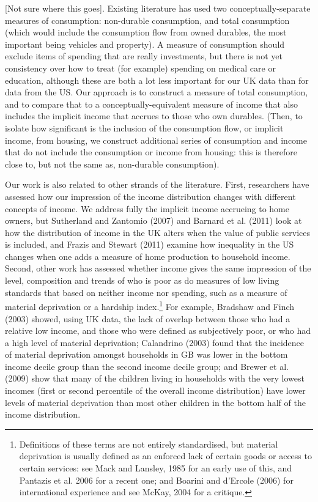 [Not sure where this goes]. Existing literature has used two conceptually-separate measures of consumption: non-durable consumption, and total consumption (which would include the consumption flow from owned durables, the most important being vehicles and property). A measure of consumption should exclude items of spending that are really investments, but there is not yet consistency over how to treat (for example) spending on medical care or education, although these are both a lot less important for our UK data than for data from the US. Our approach is to construct a measure of total consumption, and to compare that to a conceptually-equivalent measure of income that also includes the implicit income that accrues to those who own durables. (Then, to isolate how significant is the inclusion of the consumption flow, or implicit income, from housing, we construct additional series of consumption and income that do not include the consumption or income from housing: this is therefore close to, but not the same as, non-durable consumption).

Our work is also related to other strands of the literature. First, researchers have assessed how our impression of the income distribution changes with different concepts of income. We address fully the implicit income accrueing to home owners, but Sutherland and Zantomio (2007) and Barnard et al. (2011) look at how the distribution of income in the UK alters when the value of public services is included, and Frazis and Stewart (2011) examine how inequality in the US changes when one adds a measure of home production to household income.  Second, other work has assessed whether income gives the same impression of the level, composition and trends of who is poor as do measures of low living standards that based on neither income nor spending, such as a measure of material deprivation or a hardship index.\footnote{ Definitions of these terms are not entirely standardised, but material deprivation is usually defined as an enforced lack of certain goods or access to certain services: see Mack and Lansley, 1985 for an early use of this, and Pantazis et al. 2006 for a recent one; and Boarini and d'Ercole (2006) for international experience and see McKay, 2004 for a critique.} For example, Bradshaw and Finch (2003) showed, using UK data, the lack of overlap between those who had a relative low income, and those who were defined as subjectively poor, or who had a high level of material deprivation; Calandrino (2003) found that the incidence of material deprivation amongst households in GB was lower in the bottom income decile group than the second income decile group; and Brewer et al. (2009) show that many of the children living in households with the very lowest incomes (first or second percentile of the overall income distribution) have lower levels of material deprivation than most other children in the bottom half of the income distribution.


